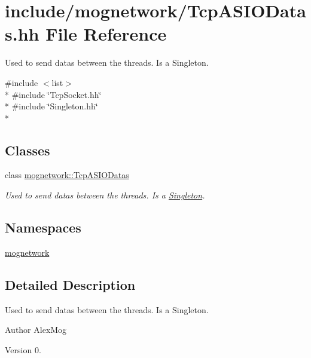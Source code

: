 \hypertarget{_tcp_a_s_i_o_datas_8hh}{\section{include/mognetwork/\-Tcp\-A\-S\-I\-O\-Datas.hh File Reference}
\label{_tcp_a_s_i_o_datas_8hh}
}


Used to send datas between the threads. Is a Singleton.  


{\ttfamily \#include $<$list$>$}\\*
{\ttfamily \#include \char`\"{}Tcp\-Socket.\-hh\char`\"{}}\\*
{\ttfamily \#include \char`\"{}Singleton.\-hh\char`\"{}}\\*
\subsection*{Classes}
\begin{DoxyCompactItemize}
\item 
class \hyperlink{classmognetwork_1_1_tcp_a_s_i_o_datas}{mognetwork\-::\-Tcp\-A\-S\-I\-O\-Datas}
\begin{DoxyCompactList}\small\item\em Used to send datas between the threads. Is a \hyperlink{classmognetwork_1_1_singleton}{Singleton}. \end{DoxyCompactList}\end{DoxyCompactItemize}
\subsection*{Namespaces}
\begin{DoxyCompactItemize}
\item 
\hyperlink{namespacemognetwork}{mognetwork}
\end{DoxyCompactItemize}


\subsection{Detailed Description}
Used to send datas between the threads. Is a Singleton. \begin{DoxyAuthor}{Author}
Alex\-Mog 
\end{DoxyAuthor}
\begin{DoxyVersion}{Version}
0. 
\end{DoxyVersion}

